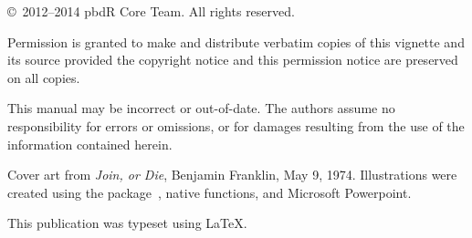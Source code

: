 \null
\vfill

\copyright\ 2012--2014 pbdR Core Team.  All rights reserved.

Permission is granted to make and distribute verbatim copies of this vignette
and its source provided the copyright notice and this permission notice are
preserved on all copies.

This manual may be incorrect or out-of-date.  The authors assume
no responsibility for errors or omissions, or for damages resulting
from the use of the information contained herein.

Cover art from \textit{Join, or Die}, Benjamin Franklin, May 9, 1974.  Illustrations were created 
using the  package~\citep{ggplot2}, native  functions, and Microsoft 
Powerpoint.

This publication was typeset using \LaTeX. 